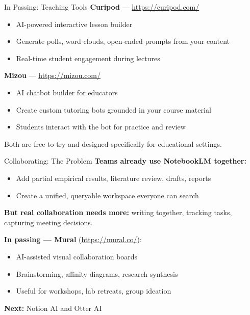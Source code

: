 \documentclass[aspectratio=169]{beamer}
\begin{document}
\begin{frame}{In Passing: Teaching Tools}
    \textbf{Curipod} --- \url{https://curipod.com/}
    \begin{itemize}
        \item AI-powered interactive lesson builder
        \item Generate polls, word clouds, open-ended prompts from your content
        \item Real-time student engagement during lectures
    \end{itemize}

    \vspace{1.5em}
    \textbf{Mizou} --- \url{https://mizou.com/}
    \begin{itemize}
        \item AI chatbot builder for educators
        \item Create custom tutoring bots grounded in your course material
        \item Students interact with the bot for practice and review
    \end{itemize}

    \vspace{1em}
    Both are free to try and designed specifically for educational settings.
\end{frame}


\begin{frame}{Collaborating: The Problem}
    \textbf{Teams already use NotebookLM together:}
    \begin{itemize}
        \item Add partial empirical results, literature review, drafts, reports
        \item Create a unified, queryable workspace everyone can search
    \end{itemize}

    \vspace{1em}
    \textbf{But real collaboration needs more:} writing together, tracking tasks, capturing meeting decisions.

    \vspace{1em}
    \textbf{In passing --- Mural} (\url{https://mural.co/}):
    \begin{itemize}
        \item AI-assisted visual collaboration boards
        \item Brainstorming, affinity diagrams, research synthesis
        \item Useful for workshops, lab retreats, group ideation
    \end{itemize}

    \vspace{1em}
    \textbf{Next:} Notion AI and Otter AI
\end{frame}
\end{document}
